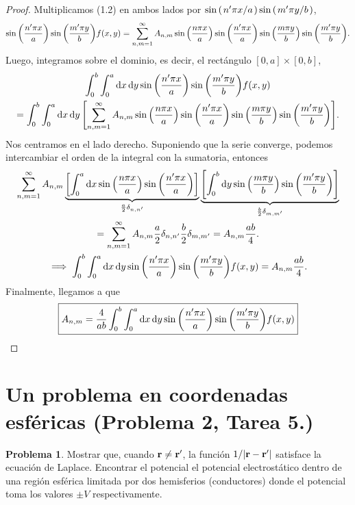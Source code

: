 \documentclass[11pt]{article}
\theoremstyle{definition}
\newtheorem*{problem}{Problema}
\numberwithin{equation}{section}
\begin{document}
\begin{proof}
    Multiplicamos (1.2) en ambos lados por $\sin\pqty{\flatfrac{n'\pi x}{a}}\sin\pqty{\flatfrac{m'\pi y}{b}}$,
    \begin{equation}
        \sin\pqty{\frac{n'\pi x}{a}}\sin\pqty{\frac{m'\pi y}{b}}f(x,y) = \sum_{n,m=1}^{\infty} A_{n,m}\sin\pqty{\frac{n\pi x}{a}}\sin\pqty{\frac{n'\pi x}{a}}\sin\pqty{\frac{m\pi y}{b}}\sin\pqty{\frac{m'\pi y}{b}}.
    \end{equation}
    Luego, integramos sobre el dominio, es decir, el rectángulo $[0,a]\times[0,b]$,
    \begin{multline}
        \int_{0}^{b}\int_{0}^{a}\dd{x}\dd{y}\sin\pqty{\frac{n'\pi x}{a}}\sin\pqty{\frac{m'\pi y}{b}}f(x,y) \\ =
        \int_{0}^{b}\int_{0}^{a}\dd{x}\dd{y}\bqty{\sum_{n,m=1}^{\infty} A_{n,m}\sin\pqty{\frac{n\pi x}{a}}\sin\pqty{\frac{n'\pi x}{a}}\sin\pqty{\frac{m\pi y}{b}}\sin\pqty{\frac{m'\pi y}{b}}}.
    \end{multline}
    Nos centramos en el lado derecho. Suponiendo que la serie converge, podemos intercambiar el orden de la integral con la sumatoria, entonces
    \begin{gather}
        \sum_{n,m=1}^{\infty} A_{n,m}\underbrace{\bqty{\int_{0}^{a}\dd{x}\sin\pqty{\frac{n\pi x}{a}}\sin\pqty{\frac{n'\pi x}{a}}}}_{\frac{a}{2}\delta_{n,n'}}\underbrace{\bqty{\int_{0}^{b}\dd{y}\sin\pqty{\frac{m\pi y}{b}}\sin\pqty{\frac{m'\pi y}{b}}}}_{\frac{b}{2}\delta_{m,m'}}\\
        = \sum_{n,m=1}^{\infty} A_{n,m} \frac{a}{2}\delta_{n,n'}\frac{b}{2}\delta_{m,m'} = A_{n,m}\frac{ab}{4}.\\
        \implies \int_{0}^{b}\int_{0}^{a}\dd{x}\dd{y}\sin\pqty{\frac{n'\pi x}{a}}\sin\pqty{\frac{m'\pi y}{b}}f(x,y) = A_{n,m}\frac{ab}{4}.
    \end{gather}
    Finalmente, llegamos a que
    \begin{equation}
        \boxed{A_{n,m} = \frac{4}{ab}\int_{0}^{b}\int_{0}^{a}\dd{x}\dd{y}\sin\pqty{\frac{n'\pi x}{a}}\sin\pqty{\frac{m'\pi y}{b}}f(x,y)}
    \end{equation}
\end{proof}

\section{Un problema en coordenadas esféricas (Problema 2, Tarea 5.)}

\begin{problem}

Mostrar que, cuando $\vb{r} \neq \vb{r'}$, la función $1/|\vb{r} - \vb{r'}|$ satisface la ecuación de Laplace. Encontrar el potencial el potencial electrostático dentro de una región esférica limitada por dos hemisferios (conductores) donde el potencial toma los valores $\pm V$ respectivamente.

\end{problem}
\end{document}
